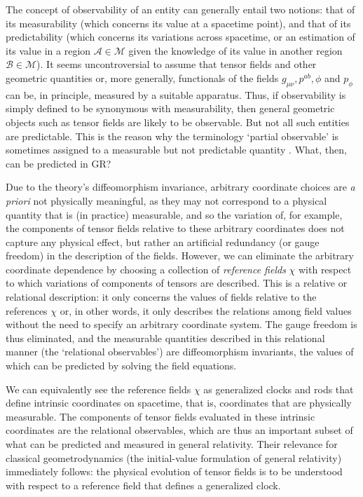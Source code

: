 \documentclass[12pt]{iopart}
\begin{document}
The concept of observability of an entity can generally entail two notions: that of its measurability (which concerns its value at a spacetime point), and that of its predictability (which concerns its variations across spacetime, or an estimation of its value in a region $\mathcal{A}\in\mathcal{M}$ given the knowledge of its value in another region $\mathcal{B}\in\mathcal{M}$). It seems uncontroversial to assume that tensor fields and other geometric quantities or, more generally, functionals of the fields $g_{\mu\nu}, p^{ab}, \phi$ and $p_{\phi}$ can be, in principle, measured by a suitable apparatus. Thus, if observability is simply defined to be synonymous with measurability, then general geometric objects such as tensor fields are likely to be observable. But not all such entities are predictable. This is the reason why the terminology `partial observable' is sometimes assigned to a measurable but not predictable quantity \citep{Rovelli:2001bz}. What, then, can be predicted in GR? 

Due to the theory's diffeomorphism invariance, arbitrary coordinate choices are \emph{a priori} not physically meaningful, as they may not correspond to a physical quantity that is (in practice) measurable, and so the variation of, for example, the components of tensor fields relative to these arbitrary coordinates does not capture any physical effect, but rather an artificial redundancy (or gauge freedom) in the description of the fields. However, we can eliminate the arbitrary coordinate dependence by choosing a collection of {\em reference fields} $\chi$ with respect to which variations of components of tensors are described. This is a relative or relational description: it only concerns the values of fields relative to the references $\chi$ or, in other words, it only describes the relations among field values without the need to specify an arbitrary coordinate system. The gauge freedom is thus eliminated, and the measurable quantities described in this relational manner (the `relational observables') are diffeomorphism invariants, the values of which can be predicted by solving the field equations.

We can equivalently see the  reference fields $\chi$ as generalized clocks and rods that define intrinsic coordinates on spacetime, that is, coordinates that are physically measurable. The components of tensor fields evaluated in these intrinsic coordinates are the relational observables, which are thus an important subset of what can be predicted and measured in general relativity. Their relevance for classical geometrodynamics (the initial-value formulation of general relativity) immediately follows: the physical evolution of tensor fields is to be understood with respect to a reference field that defines a generalized clock.
\end{document}
